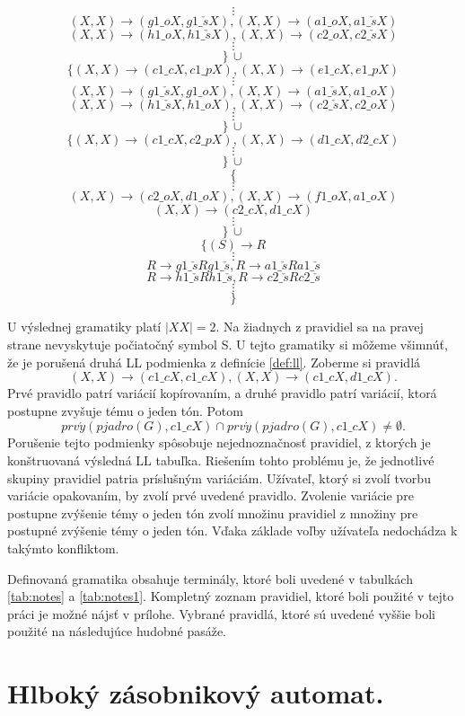 \begin{definition}
$$\vdots$$
$$(X,X) \rightarrow (g1\_oX, g1\_\check{s}X), (X,X) \rightarrow (a1\_oX, a1\_\check{s}X)$$
$$(X,X) \rightarrow (h1\_oX, h1\_\check{s}X), (X,X) \rightarrow (c2\_oX, c2\_\check{s}X)$$
$$\vdots$$
$$\}\, \cup$$
$$\{(X,X) \rightarrow (c1\_cX, c1\_pX), (X,X) \rightarrow (e1\_cX, e1\_pX)$$
$$\vdots$$
$$(X,X) \rightarrow (g1\_\check{s}X, g1\_oX), (X,X) \rightarrow (a1\_\check{s}X, a1\_oX)$$
$$(X,X) \rightarrow (h1\_\check{s}X, h1\_oX), (X,X) \rightarrow (c2\_\check{s}X, c2\_oX)$$
$$\vdots$$
$$\}\, \cup$$
$$\{(X,X) \rightarrow (c1\_cX, c2\_pX), (X,X) \rightarrow (d1\_cX, d2\_cX)$$
$$\vdots$$
$$\}\, \cup$$
$$\{$$
$$\vdots$$
$$(X,X) \rightarrow (c2\_oX, d1\_oX), (X,X) \rightarrow (f1\_oX, a1\_oX)$$
$$(X,X) \rightarrow (c2\_cX, d1\_cX)$$
$$\vdots$$
$$\}\, \cup$$
$$\{(S) \rightarrow R$$
$$\vdots$$
$$R \rightarrow g1\_\check{s}Rg1\_\check{s}, R \rightarrow a1\_\check{s}Ra1\_\check{s}$$
$$R \rightarrow h1\_\check{s}Rh1\_\check{s}, R \rightarrow c2\_\check{s}Rc2\_\check{s}$$
$$\vdots$$
$$\}$$

U výslednej gramatiky platí $|XX| = 2$. Na žiadnych z pravidiel sa na pravej strane nevyskytuje počiatočný symbol S. U tejto gramatiky si môžeme všimnúť, že je porušená druhá LL podmienka z definície \ref{def:ll}. Zoberme si pravidlá $$(X,X) \rightarrow (c1\_cX, c1\_cX), (X,X) \rightarrow (c1\_cX, d1\_cX).$$ Prvé pravidlo patrí variácií kopírovaním, a druhé pravidlo patrí variácií, ktorá postupne zvyšuje tému o jeden tón. Potom $$prv\acute{y}(pjadro(G),c1\_cX) \cap prv\acute{y}(pjadro(G),c1\_cX) \neq \emptyset.$$ Porušenie tejto podmienky spôsobuje nejednoznačnosť pravidiel, z ktorých je konštruovaná výsledná LL tabuľka. Riešením tohto problému je, že jednotlivé skupiny pravidiel patria príslušným variáciám. Užívateľ, ktorý si zvolí tvorbu variácie opakovaním, by zvolí prvé uvedené pravidlo. Zvolenie variácie pre postupne zvýšenie témy o jeden tón zvolí množinu pravidiel z množiny pre postupné zvýšenie témy o jeden tón. Vďaka základe voľby užívateľa nedochádza k takýmto konfliktom.
\end{definition}

Definovaná gramatika obsahuje terminály, ktoré boli uvedené v tabulkách \ref{tab:notes} a \ref{tab:notes1}. Kompletný zoznam pravidiel, ktoré boli použité v tejto práci je možné nájsť v prílohe. Vybrané pravidlá, ktoré sú uvedené vyššie boli použité na následujúce hudobné pasáže. 

\section{Hlboký zásobnikový automat.}

